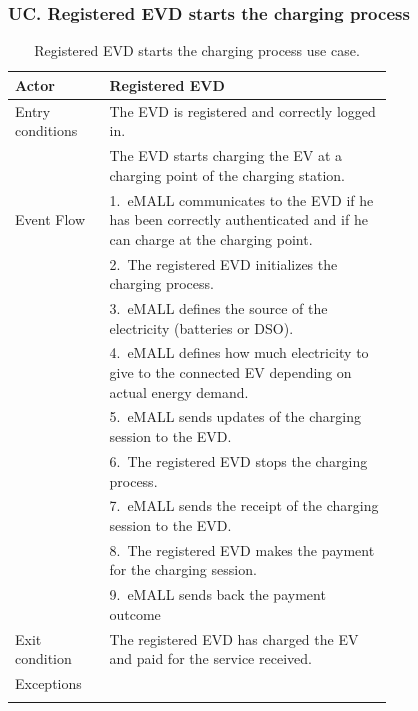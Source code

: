 \subsubsection*{UC\cuc . Registered EVD starts the charging process}
\begin{center}
    \begin{longtable}{lp{0.75\linewidth}}
        \hline
        Actor            & Registered EVD                                                                                                       \\
        \hline
        Entry conditions & The EVD is registered and correctly logged in.                                                                       \\
        & The EVD starts charging the EV at a charging point of the charging station.                                          \\
        \hline
        Event Flow       & 1.\ eMALL communicates to the EVD if he has been correctly authenticated and if he can charge at the charging point. \\
        & 2.\ The registered EVD initializes the charging process.                                                             \\
        & 3.\ eMALL defines the source of the electricity (batteries or DSO).                                                  \\
        & 4.\ eMALL defines how much electricity to give to the connected EV depending on actual energy demand.                \\
        & 5.\ eMALL sends updates of the charging session to the EVD.                                                          \\
        & 6.\ The registered EVD stops the charging process.                                                                   \\
        & 7.\ eMALL sends the receipt of the charging session to the EVD.                                                      \\
        & 8.\ The registered EVD makes the payment for the charging session.                                                   \\
        & 9.\ eMALL sends back the payment outcome                                                                             \\
        \hline
        Exit condition   & The registered EVD has charged the EV and paid for the service received.                                             \\
        \hline
        Exceptions       &                                                                                                                      \\
        \hline
        \caption{Registered EVD starts the charging process use case.}
        \label{tab: EVD_charges_EV_use_case}
    \end{longtable}


\end{center}
